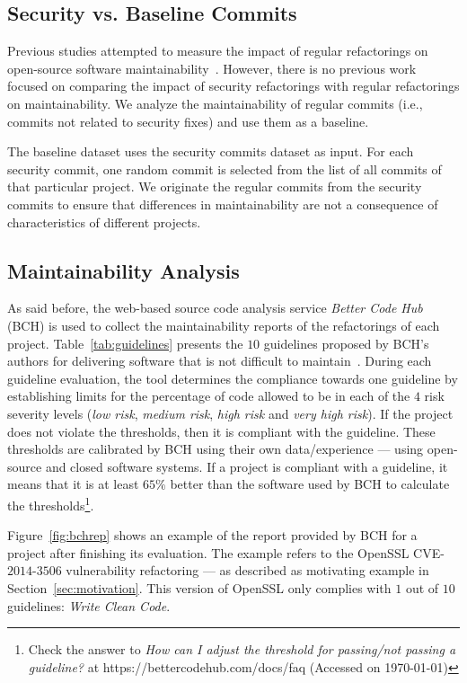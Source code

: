 \documentclass[10pt,conference]{IEEEtran}
\begin{document}
%
\subsection{Security vs. Baseline Commits}
%
Previous studies attempted to measure the impact of regular refactorings on
open-source software maintainability~\cite{HEGEDUS2018313}. However, there is no
previous work focused on comparing the impact of security refactorings with
regular refactorings on maintainability. We analyze the maintainability of
regular commits (i.e., commits not related to security fixes) and use them as a
baseline.

The baseline dataset uses the security commits dataset as input. For each
security commit, one random commit is selected from the list of all commits of
that particular project. We originate the regular commits from the security
commits to ensure that differences in maintainability are not a consequence of
characteristics of different projects.
%
\subsection{Maintainability Analysis}

As said before, the web-based source code analysis service \emph{Better Code
Hub} (BCH) is used to collect the maintainability reports of the refactorings of
each project. Table~\ref{tab:guidelines} presents the $10$ guidelines proposed
by BCH's authors for delivering software that is not difficult to
maintain~\cite{Visser:2016:OREILLY}. During each guideline evaluation, the tool
determines the compliance towards one guideline by establishing limits for the
percentage of code allowed to be in each of the $4$ risk severity levels
(\emph{low risk}, \emph{medium risk}, \emph{high risk} and \emph{very high
risk}). If the project does not violate the thresholds, then it is compliant
with the guideline. These thresholds are calibrated by BCH using their own
data/experience --- using open-source and closed software systems. If a project is
compliant with a guideline, it means that it is at least $65\%$ better than the
software used by BCH to calculate the thresholds\footnote{Check the answer to
\emph{How can I adjust the threshold for passing/not passing a guideline?} at
https://bettercodehub.com/docs/faq (Accessed on \today{})}.

Figure~\ref{fig:bchrep} shows an example of the report
provided by BCH for a project after finishing its evaluation. The example
refers to the OpenSSL CVE-$2014$-$3506$ vulnerability refactoring ---
as described as motivating example in Section~\ref{sec:motivation}. This
version of OpenSSL only complies with $1$ out of $10$ guidelines: \emph{Write
Clean Code}.
\end{document}
